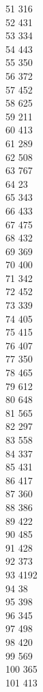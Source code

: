 { 51	316 \\
 52	431 \\
 53	334 \\
 54	443 \\
 55	350 \\
 56	372 \\
 57	452 \\
 58	625 \\
 59	211 \\
 60	413 \\
 61	289 \\
 62	508 \\
 63	767 \\
 64	23 \\
 65	343 \\
 66	433 \\
 67	475 \\
 68	432 \\
 69	369 \\
 70	400 \\
 71	342 \\
 72	452 \\
 73	339 \\
 74	405 \\
 75	415 \\
 76	407 \\
 77	350 \\
 78	465 \\
 79	612 \\
 80	648 \\
 81	565 \\
 82	297 \\
 83	558 \\
 84	337 \\
 85	431 \\
 86	417 \\
 87	360 \\
 88	386 \\
 89	422 \\
 90	485 \\
 91	428 \\
 92	373 \\
 93	4192 \\
 94	38 \\
 95	398 \\
 96	345 \\
 97	498 \\
 98	420 \\
 99	569 \\
 100	365 \\
 101	413 \\
}
